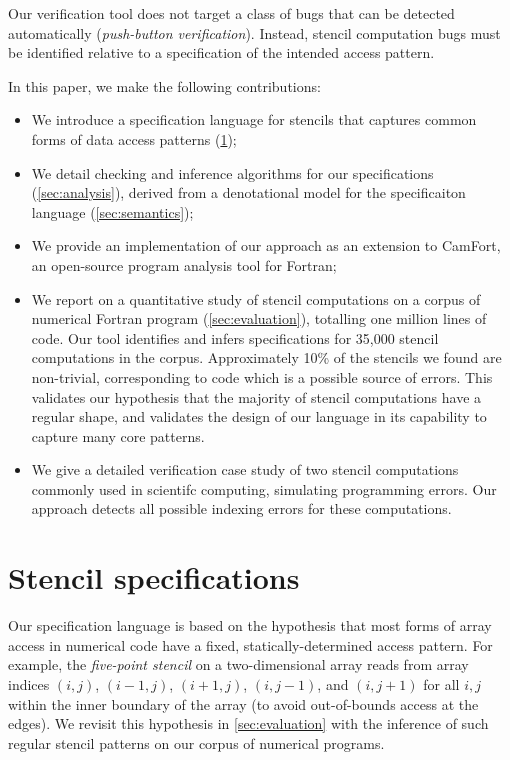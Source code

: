 \documentclass[10pt,preprint,numbers]{sigplanconf}
\theoremstyle{definition}
\begin{document}
Our verification tool does not target a
class of bugs that can be detected automatically (\emph{push-button
  verification}). Instead, stencil computation bugs must be
identified relative to a specification of the intended access pattern.

In this paper, we make the following contributions:
%
\begin{itemize}
\item We introduce a specification language for stencils
  that captures common forms of data access patterns
  (\cref{sec:lang});

\item We detail checking and inference algorithms for our
  specifications (\cref{sec:analysis}), derived from a
  denotational model for the specificaiton language
  (\cref{sec:semantics});

\item We provide an implementation of our approach as an extension to
  CamFort, an open-source program analysis tool for Fortran;

\item We report on a quantitative study of stencil computations on a
  corpus of numerical Fortran program
  (\cref{sec:evaluation}), totalling one million lines of code. Our tool
  identifies and infers specifications for 35,000 stencil computations in the
  corpus. Approximately 10\% of the stencils we found are non-trivial,
  corresponding to code which is a possible source of errors. This validates
  our hypothesis that the majority of stencil computations have a regular
  shape, and validates the design of our language in its capability to capture
  many core patterns.

\item We give a detailed verification case study of two
  stencil computations commonly used in scientifc computing,
  simulating programming errors. Our approach detects all
  possible indexing errors for these computations.
\end{itemize}
%

\newcommand{\domainVal}{\mathbb{Z}_\infty}
\section{Stencil specifications}\label{sec:lang}

Our specification language is based on the hypothesis
that most forms of array access in numerical code have
a fixed, statically-determined access pattern. For example, the
\emph{five-point stencil} on a two-dimensional array reads from array
indices $(i, j)$, $(i-1, j)$, $(i+1, j)$, $(i, j-1)$, and $(i, j+1)$
for all $i, j$ within the inner boundary of the array (to avoid
out-of-bounds access at the edges). We revisit this hypothesis
in \cref{sec:evaluation} with the inference of
such regular stencil patterns on our corpus of numerical programs.
\end{document}
